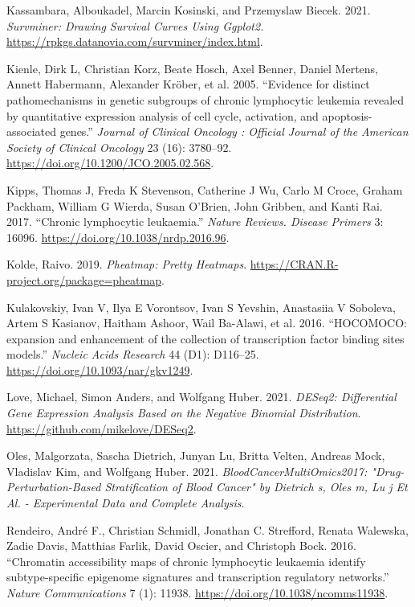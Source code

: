 \documentclass[11pt, a4paper, twosided]{book}
\newenvironment{CSLReferences}%
  {}%
  {\par}
\begin{document}
\begin{CSLReferences}{1}{0}
\leavevmode{}%
Kassambara, Alboukadel, Marcin Kosinski, and Przemyslaw Biecek. 2021. \emph{Survminer: Drawing Survival Curves Using Ggplot2}. \url{https://rpkgs.datanovia.com/survminer/index.html}.

\leavevmode{}%
Kienle, Dirk L, Christian Korz, Beate Hosch, Axel Benner, Daniel Mertens, Annett Habermann, Alexander Kröber, et al. 2005. {``{Evidence for distinct pathomechanisms in genetic subgroups of chronic lymphocytic leukemia revealed by quantitative expression analysis of cell cycle, activation, and apoptosis-associated genes.}''} \emph{Journal of Clinical Oncology : Official Journal of the American Society of Clinical Oncology} 23 (16): 3780--92. \url{https://doi.org/10.1200/JCO.2005.02.568}.

\leavevmode{}%
Kipps, Thomas J, Freda K Stevenson, Catherine J Wu, Carlo M Croce, Graham Packham, William G Wierda, Susan O'Brien, John Gribben, and Kanti Rai. 2017. {``{Chronic lymphocytic leukaemia.}''} \emph{Nature Reviews. Disease Primers} 3: 16096. \url{https://doi.org/10.1038/nrdp.2016.96}.

\leavevmode{}%
Kolde, Raivo. 2019. \emph{Pheatmap: Pretty Heatmaps}. \url{https://CRAN.R-project.org/package=pheatmap}.

\leavevmode{}%
Kulakovskiy, Ivan V, Ilya E Vorontsov, Ivan S Yevshin, Anastasiia V Soboleva, Artem S Kasianov, Haitham Ashoor, Wail Ba-Alawi, et al. 2016. {``{HOCOMOCO: expansion and enhancement of the collection of transcription factor binding sites models.}''} \emph{Nucleic Acids Research} 44 (D1): D116--25. \url{https://doi.org/10.1093/nar/gkv1249}.

\leavevmode{}%
Love, Michael, Simon Anders, and Wolfgang Huber. 2021. \emph{DESeq2: Differential Gene Expression Analysis Based on the Negative Binomial Distribution}. \url{https://github.com/mikelove/DESeq2}.

\leavevmode{}%
Oles, Malgorzata, Sascha Dietrich, Junyan Lu, Britta Velten, Andreas Mock, Vladislav Kim, and Wolfgang Huber. 2021. \emph{BloodCancerMultiOmics2017: "Drug-Perturbation-Based Stratification of Blood Cancer" by Dietrich s, Oles m, Lu j Et Al. - Experimental Data and Complete Analysis}.

\leavevmode{}%
Rendeiro, André F., Christian Schmidl, Jonathan C. Strefford, Renata Walewska, Zadie Davis, Matthias Farlik, David Oscier, and Christoph Bock. 2016. {``{Chromatin accessibility maps of chronic lymphocytic leukaemia identify subtype-specific epigenome signatures and transcription regulatory networks}.''} \emph{Nature Communications} 7 (1): 11938. \url{https://doi.org/10.1038/ncomms11938}.


\end{CSLReferences}
\end{document}
